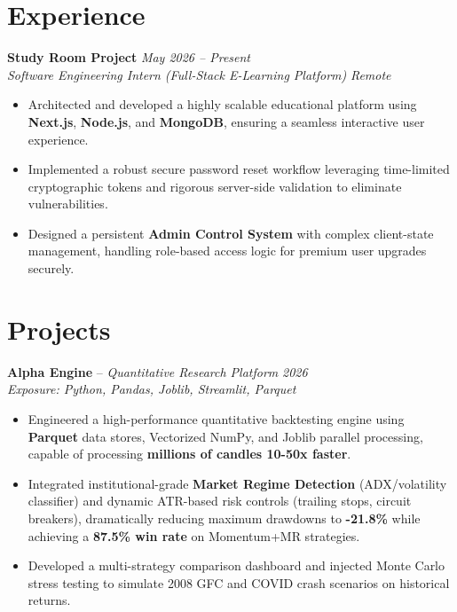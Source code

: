 \documentclass[10pt,a4paper]{article}
\begin{document}
\section*{Experience}
\noindent\textbf{Study Room Project} \hfill \textit{May 2026 -- Present} \\
\textit{Software Engineering Intern (Full-Stack E-Learning Platform)} \hfill \textit{Remote}
\begin{itemize}
    \item \small Architected and developed a highly scalable educational platform using \textbf{Next.js}, \textbf{Node.js}, and \textbf{MongoDB}, ensuring a seamless interactive user experience.
    \item \small Implemented a robust secure password reset workflow leveraging time-limited cryptographic tokens and rigorous server-side validation to eliminate vulnerabilities.
    \item \small Designed a persistent \textbf{Admin Control System} with complex client-state management, handling role-based access logic for premium user upgrades securely.
\end{itemize}

\section*{Projects}

\noindent\textbf{Alpha Engine} -- \textit{Quantitative Research Platform} \hfill \textit{2026} \\
\textit{Exposure: Python, Pandas, Joblib, Streamlit, Parquet}
\begin{itemize}
    \item \small Engineered a high-performance quantitative backtesting engine using \textbf{Parquet} data stores, Vectorized NumPy, and Joblib parallel processing, capable of processing \textbf{millions of candles 10-50x faster}.
    \item \small Integrated institutional-grade \textbf{Market Regime Detection} (ADX/volatility classifier) and dynamic ATR-based risk controls (trailing stops, circuit breakers), dramatically reducing maximum drawdowns to \textbf{-21.8\%} while achieving a \textbf{87.5\% win rate} on Momentum+MR strategies.
    \item \small Developed a multi-strategy comparison dashboard and injected Monte Carlo stress testing to simulate 2008 GFC and COVID crash scenarios on historical returns.
\end{itemize}
\end{document}
